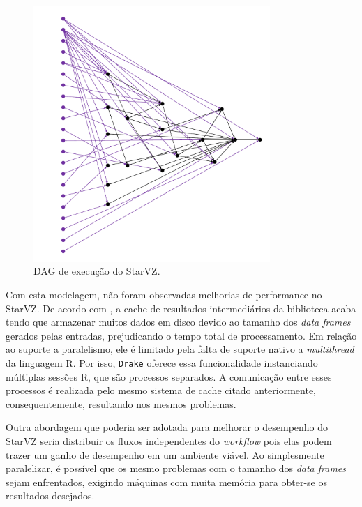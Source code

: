\begin{figure}[ht]
\centerline{
\includegraphics[width=0.8\textwidth]{./img/drake-dag-final-origin.pdf}}
 \caption{DAG de execução do StarVZ.}
 \label{fig:starvz-dag}
\end{figure}

Com esta modelagem, não foram observadas melhorias de performance no StarVZ. De 
acordo com \citet{ref:drakestarvz},
a cache de resultados intermediários da biblioteca acaba tendo que armazenar 
muitos dados em disco devido
ao tamanho dos \emph{data frames} gerados pelas entradas, prejudicando o tempo 
total de processamento.
Em relação ao suporte a paralelismo, ele é limitado pela falta de suporte 
nativo 
a \emph{multithread} da linguagem R.
Por isso, \texttt{Drake} oferece essa funcionalidade instanciando múltiplas 
sessões R, que são processos separados. A comunicação
entre esses processos é realizada pelo mesmo sistema de cache citado 
anteriormente, consequentemente, resultando nos mesmos
problemas.

Outra abordagem que poderia ser adotada para melhorar o desempenho do StarVZ 
seria distribuir os fluxos independentes
do \emph{workflow} pois elas podem trazer um ganho de desempenho em um ambiente 
viável.
Ao simplesmente paralelizar, é possível que os mesmo problemas com o tamanho 
dos 
\emph{data frames} sejam enfrentados, exigindo
máquinas com muita memória para obter-se os resultados desejados. 

